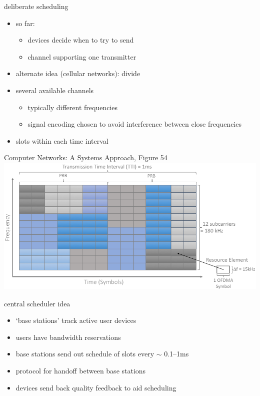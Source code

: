 \begin{frame}{deliberate scheduling}
\begin{itemize}
\item so far: 
    \begin{itemize}
    \item devices decide when to try to send
    \item channel supporting one transmitter
    \end{itemize}
\vspace{.5cm}
\item alternate idea (cellular networks): divide
\item several available channels
    \begin{itemize}
    \item typically different frequencies
    \item signal encoding chosen to avoid interference between close frequencies
    \end{itemize}
\item slots within each time interval
\end{itemize}
\end{frame}

\begin{frame}

{\fontsize{9}{10}\selectfont Computer Networks: A Systems Approach, Figure 54}
\includegraphics[width=\textwidth]{../multiaccess/CNSA-Fig54}
\end{frame}

\begin{frame}{central scheduler idea}
    \begin{itemize}
    \item `base stations' track active user devices
    \item users have bandwidth reservations
    \vspace{.5cm}
    \item base stations send out schedule of slots every $\sim$ 0.1--1ms
    \item protocol for handoff between base stations
    \item devices send back quality feedback to aid scheduling
    \end{itemize}
\end{frame}

